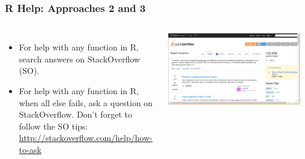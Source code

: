 \begin{frame}[fragile]
\frametitle{R Help: Approaches 2 and 3}

  \begin{columns}
  \begin{itemize}
    \item For help with any function in R, search answers on StackOverflow (SO).
    \item For help with any function in R, when all else fails, ask a question on StackOverflow.  Don't forget to follow the SO tips: \url{http://stackoverflow.com/help/how-to-ask}
  \end{itemize}

  \begin{center}
  \includegraphics[width=0.95\textwidth]{images/SO}
  \end{center}
  \end{columns}

\end{frame}



